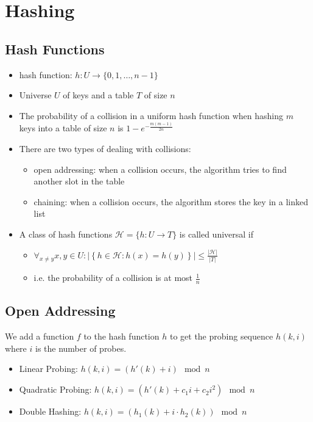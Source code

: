 \section{Hashing}

\subsection{Hash Functions}
\begin{itemize}
    \item hash function: \( h: U \rightarrow \{0, 1, \ldots, n-1\} \)
    \item Universe \( U \) of keys and a table \( T \) of size \( n \)
    \item The probability of a collision in a uniform hash function when hashing \( m \) keys into a table of size \( n \) is \( 1 - e^{- \frac{m(m-1)}{2n}}\)
    \item There are two types of dealing with collisions:
        \begin{itemize}
            \item open addressing: when a collision occurs, the algorithm tries to find another slot in the table
            \item chaining: when a collision occurs, the algorithm stores the key in a linked list
        \end{itemize}
    \item A class of hash functions \( \mathcal{H} =  \{ h: U \rightarrow T \} \) is called universal if
        \begin{itemize}
            \item \( \forall_{x \neq y} x, y \in U : \left| \left\{ h \in \mathcal{H}: h(x) = h(y) \right\}\right| \leq \frac{|\mathcal{H}|}{|T|}   \)
            \item i.e. the probability of a collision is at most \( \frac{1}{n} \)
        \end{itemize}
        
\end{itemize}

\subsection{Open Addressing}
We add a function \( f \) to the hash function \( h \) to get the probing sequence \( h(k, i) \) where \( i \) is the number of probes.
\begin{itemize}
    \item Linear Probing: \( h(k, i) = (h'(k) + i) \mod n \) 
    \item Quadratic Probing: \( h(k, i) = (h'(k) + c_1i + c_2i^2) \mod n \)
    \item Double Hashing: \( h(k, i) = (h_1(k) + i \cdot h_2(k)) \mod n \)
\end{itemize}

